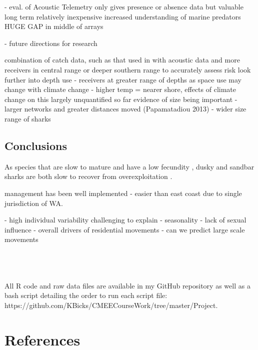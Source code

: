 \documentclass[11pt,a4paper]{article}
\begin{document}
		
		
	
	- eval. of Acoustic Telemetry
	only gives presence or absence data but valuable long term \citep{Bass2017}
	relatively inexpensive \citep{Speed2010}
	increased understanding of marine predators \citep{Espinoza2016}
	HUGE GAP in middle of arrays

	- future directions for research
	
	combination of catch data, such as that used in \citep{Braccini2017a} with acoustic data and more receivers in central range or deeper southern range to accurately assess risk
	look further into depth use - receivers at greater range of depths as space use may change with climate change - higher temp = nearer shore, effects of climate change on this largely unquantified so far \citep{Speed2010}
	evidence of size being important - larger networks \citep{Espinoza2015}and greater distances moved (Papamatadiou 2013) - wider size range of sharks

	\subsection{Conclusions}
	
	As species that are slow to mature and have a low fecundity \citep{Cortes2000}, dusky and sandbar sharks are both slow to recover from overexploitation \citep{Rogers2013}. 
	
	management has been well implemented - easier than east coast due to single jurisdiction of WA. \citep{Heupel2015}

	- high individual variability
	challenging to explain \citep{Espinoza2015}
	- seasonality
	- lack of sexual influence
	- overall drivers of residential movements
	- can we predict large scale movements
	
	\newpage
	
	\\
	
	\\
	\\
	All R code and raw data files are available in my GitHub repository as well as a bash script detailing the order to run each script file: https://github.com/KBicks/CMEECourseWork/tree/master/Project.  
	
	\newpage
	
	\section{References}
	
\end{document}
